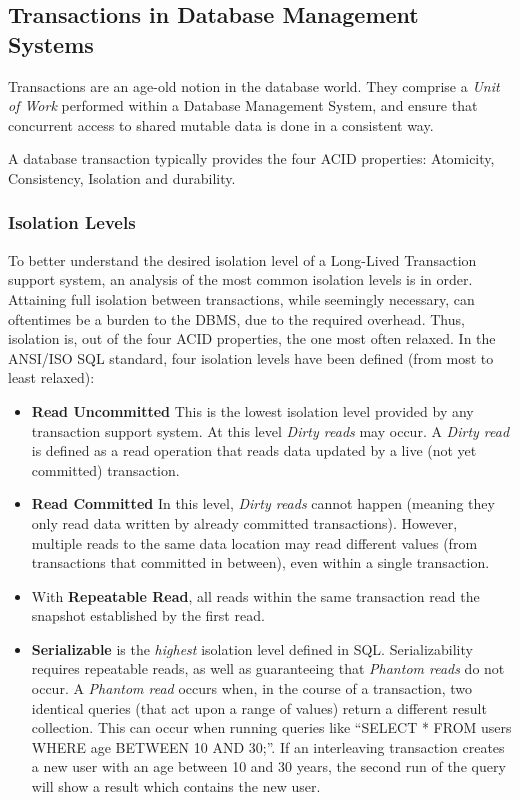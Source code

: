 \documentclass{llncs}
\begin{document}
\subsection{Transactions in Database Management Systems}
\label{sec:rdbms}

Transactions are an age-old notion in the database world. They
comprise a {\it Unit of Work} performed within a Database Management
System, and ensure that concurrent access to shared mutable data is
done in a consistent way.

A database transaction typically provides the four ACID properties:
Atomicity, Consistency, Isolation and durability.

\subsubsection{Isolation Levels}
\label{sec:isolation}

To better understand the desired isolation level of a Long-Lived
Transaction support system, an analysis of the most common isolation
levels is in order. Attaining full isolation between transactions,
while seemingly necessary, can oftentimes be a burden to the DBMS, due
to the required overhead. Thus, isolation is, out of the four ACID
properties, the one most often relaxed. In the ANSI/ISO SQL
standard\cite{melton1992ansi}, four isolation levels have been defined
(from most to least relaxed):

\begin{itemize}
\item {\bf Read Uncommitted} This is the lowest isolation level
  provided by any transaction support system. At this level {\it Dirty
    reads} may occur. A {\it Dirty read} is defined as a read
  operation that reads data updated by a live (not yet committed)
  transaction.
\item {\bf Read Committed} In this level, {\it Dirty reads} cannot
  happen (meaning they only read data written by already committed
  transactions). However, multiple reads to the same data location may
  read different values (from transactions that committed in between),
  even within a single transaction.
\item With {\bf Repeatable Read}, all reads within the same
  transaction read the snapshot established by the first read.
\item {\bf Serializable} is the {\it highest} isolation level defined
  in SQL. Serializability requires repeatable reads, as well as
  guaranteeing that {\it Phantom reads} do not occur. A {\it Phantom
    read} occurs when, in the course of a transaction, two identical
  queries (that act upon a range of values) return a different result
  collection. This can occur when running queries like ``SELECT * FROM
  users WHERE age BETWEEN 10 AND 30;''. If an interleaving transaction
  creates a new user with an age between 10 and 30 years, the second
  run of the query will show a result which contains the new user.
\end{itemize}
\end{document}
